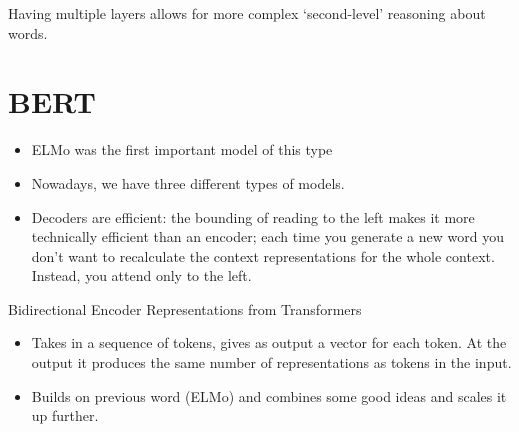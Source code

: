 \documentclass[11pt]{article}
\begin{document}
Having multiple layers allows for more complex `second-level' reasoning about words.

\begin{figure}[H]
    \centering
\end{figure}    

\section{BERT}

\begin{minipage}[l]{.5\linewidth}
    \begin{figure}[H]
        \centering
    \end{figure}    
\end{minipage}\hfill
\begin{minipage}[r]{.48\linewidth}
    \begin{itemize}
        \item ELMo was the first important model of this type
        \item Nowadays, we have three different types of models.
        \item Decoders are efficient: the bounding of reading to the left makes it more technically efficient than an encoder; each time you generate a new word you don't want to recalculate the context representations for the whole context. Instead, you attend only to the left.
    \end{itemize}
\end{minipage}

\begin{minipage}[l]{.5\linewidth}
    \begin{figure}[H]
        \centering
    \end{figure}    
\end{minipage}\hfill
\begin{minipage}[r]{.48\linewidth}
    Bidirectional Encoder Representations from Transformers
    \begin{itemize}
        \item Takes in a sequence of tokens, gives as output a vector for each token. At the output it produces the same number of representations as tokens in the input.
        \item Builds on previous word (ELMo) and combines some good ideas and scales it up further.
    \end{itemize}
\end{minipage}
\end{document}
